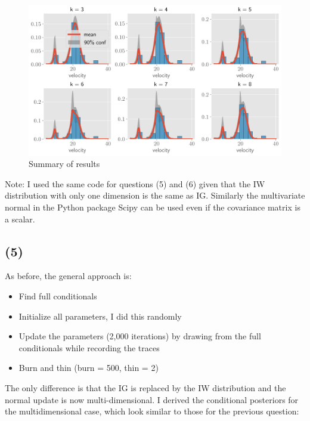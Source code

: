 \documentclass[11pt]{article}
\begin{document}
\begin{figure}[!h]
    \centering
    \includegraphics[scale=.5
    ]{../figures/galaxies.png}
    \caption{Summary of results}
    \label{fig:my_label}
\end{figure}

Note: I used the same code for questions (5) and (6) given that the IW distribution with only one dimension is the same as IG. Similarly the multivariate normal in the Python package Scipy can be used even if the covariance matrix is a scalar.

\subsection*{(5)}
As before, the general approach is:
\begin{itemize}
    \item Find full conditionals
    \item Initialize all parameters, I did this randomly 
    \item Update the parameters (2,000 iterations) by drawing from the full conditionals while recording the traces
    \item Burn and thin (burn = 500, thin = 2)
\end{itemize}

The only difference is that the IG is replaced by the IW distribution and the normal update is now multi-dimensional. I derived the conditional posteriors for the multidimensional case, which look similar to those for the previous question:
\end{document}
